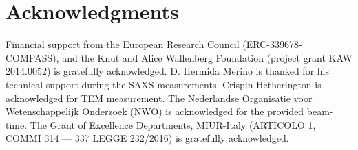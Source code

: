 \documentclass[aps,prl,preprint,superscriptaddress]{revtex4-1} %
\begin{document}
\section{Acknowledgments}
Financial support from the European Research Council (ERC-339678-COMPASS), and the Knut and Alice Wallenberg Foundation (project grant KAW 2014.0052) is gratefully acknowledged. D. Hermida Merino is thanked for his technical support during the SAXS measurements. Crispin Hetherington is acknowledged for TEM measurement. The Nederlandse Organisatie voor Wetenschappelijk Onderzoek (NWO) is acknowledged for the provided beam-time. The Grant of Excellence Departments, MIUR-Italy (ARTICOLO 1, COMMI 314 --- 337 LEGGE 232/2016)
is gratefully acknowledged.


%
%

%



\end{document}
